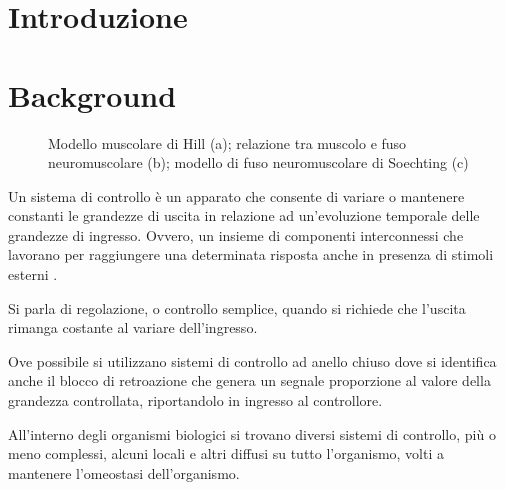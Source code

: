 \section{Introduzione}

\textcolor{blue}{\lipsum[1-2]}

\section{Background}


\begin{figure}[t!]
	\centering
	\begin{subfigure}{0.33\linewidth}
		\centering
		\footnotesize{\def\svgwidth{0.9\linewidth}
			}
		\caption{}
	\end{subfigure}\hfill
	\begin{subfigure}{0.33\linewidth}
		\centering
		\tiny{\def\svgwidth{0.8\linewidth}
			}
		\caption{}
	\end{subfigure}\hfill
	\begin{subfigure}{0.33\linewidth}
		\centering
		\footnotesize{\def\svgwidth{0.9\linewidth}
			}
		\caption{}
	\end{subfigure}\hfill
	\caption{Modello muscolare di Hill (a); relazione tra muscolo e fuso neuromuscolare (b); modello di fuso neuromuscolare di Soechting (c)}
	\label{fig:fuso}
\end{figure}


Un sistema di controllo è un apparato che consente di variare o mantenere constanti le grandezze di uscita in relazione ad un'evoluzione temporale delle grandezze di ingresso. Ovvero, un insieme di componenti interconnessi che lavorano per raggiungere una determinata risposta anche in presenza di stimoli esterni \cite{marro_controlli_2004}.  

Si parla di regolazione, o controllo semplice, quando si richiede che l'uscita rimanga costante al variare dell'ingresso.

Ove possibile si utilizzano sistemi di controllo ad anello chiuso dove si identifica anche il blocco di retroazione che genera un segnale proporzione al valore della grandezza controllata, riportandolo in ingresso al controllore.

All'interno degli organismi biologici si trovano diversi sistemi di controllo, più o meno complessi, alcuni locali e altri diffusi su tutto l'organismo, volti a mantenere l'omeostasi dell'organismo. 

